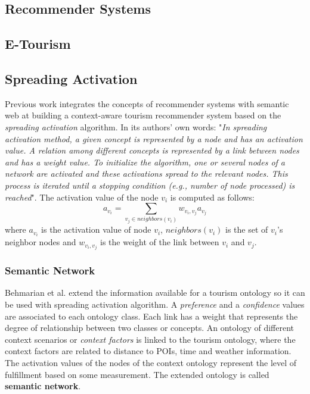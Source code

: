 \subsection{Recommender Systems}
\subsection{E-Tourism}
\subsection{Spreading Activation}
Previous work \cite{bahramian_abbaspour_claramunt_2017} integrates the concepts of recommender systems with semantic web at building a context-aware tourism recommender system based on the \textit{spreading activation} algorithm. In its authors' own words: "\textit{In spreading activation method, a given concept is represented by a node and has an activation value. A relation among different concepts is represented by a link between nodes and has a weight value. To initialize the algorithm, one or several nodes of a network are activated and these activations spread to the relevant nodes. This process is iterated until a stopping condition (e.g., number of node processed) is reached}". The activation value of the node \(v_i\) is computed as follows:
\begin{equation} \label{eq:og_activation}
a_{v_i} = \sum_{v_j \in neighbors(v_i)} w_{v_i, v_j} a_{v_j} 
\end{equation}
where $a_{v_i}$ is the activation value of node $v_i$, $neighbors(v_i)$ is the set of $v_i$'s neighbor nodes and $w_{v_i, v_j}$ is the weight of the link between $v_i$ and $v_j$.

\subsubsection{Semantic Network}
Behmarian et al. \cite{bahramian_abbaspour_claramunt_2017} extend the information available for a tourism ontology so it can be used with spreading activation algorithm. A \textit{preference} and a \textit{confidence} values are associated to each ontology class. Each link has a weight that represents the degree of relationship between two classes or concepts. An ontology of different context scenarios or \textit{context factors} is linked to the tourism ontology, where the context factors are related to distance to POIs, time and weather information. The activation values of the nodes of the context ontology represent the level of fulfillment based on some measurement. The extended ontology is called \textbf{semantic network}.

